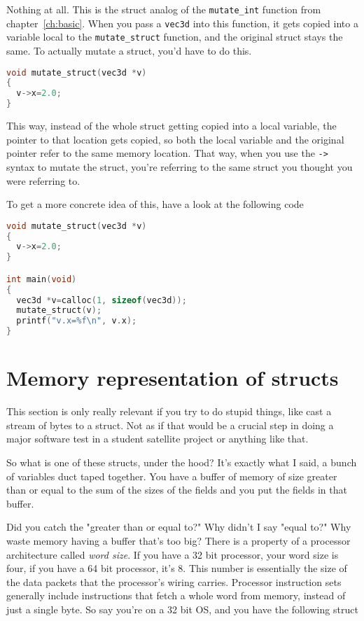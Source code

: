 \documentclass[ebook,11pt,oneside,openany]{memoir}
\newcommand{\cf}[1]{\texttt{#1}}
\begin{document}
Nothing at all. This is the struct analog of the \cf{mutate\_int} function from chapter~\ref{ch:basic}. When you pass a \cf{vec3d} into this function, it gets copied into a variable local to the \cf{mutate\_struct} function, and the original struct stays the same. To actually mutate a struct, you'd have to do this.

\begin{lstlisting}[language=C]
void mutate_struct(vec3d *v) 
{
  v->x=2.0;
}
\end{lstlisting}

This way, instead of the whole struct getting copied into a local variable, the pointer to that location gets copied, so both the local variable and the original pointer refer to the same memory location. That way, when you use the \cf{->} syntax to mutate the struct, you're referring to the same struct you thought you were referring to. 

To get a more concrete idea of this, have a look at the following code

\begin{lstlisting}[language=C]
void mutate_struct(vec3d *v)
{
  v->x=2.0;
}

int main(void)
{
  vec3d *v=calloc(1, sizeof(vec3d));
  mutate_struct(v);
  printf("v.x=%f\n", v.x);
}
\end{lstlisting}



\section{Memory representation of structs}

This section is only really relevant if you try to do stupid things, like cast a stream of bytes to a struct. Not as if that would be a crucial step in doing a major software test in a student satellite project or anything like that.

So what is one of these structs, under the hood? It's exactly what I said, a bunch of variables duct taped together. You have a buffer of memory of size greater than or equal to the sum of the sizes of the fields and you put the fields in that buffer.

Did you catch the "greater than or equal to?" Why didn't I say "equal to?" Why waste memory having a buffer that's too big? There is a property of a processor architecture called \textit{word size}. If you have a 32 bit processor, your word size is four, if you have a 64 bit processor, it's 8. This number is essentially the size of the data packets that the processor's wiring carries. Processor instruction sets generally include instructions that fetch a whole word from memory, instead of just a single byte. So say you're on a 32 bit OS, and you have the following struct
\end{document}
